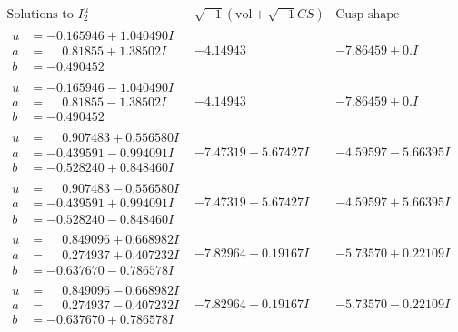 \documentclass[1p]{elsarticle_modified}
\theoremstyle{definition}
\newcommand{\I}{\sqrt{-1}}
\begin{document}
$$\begin{array}{c|c|c}  
\text{Solutions to }I^u_{2}& \I (\text{vol} + \sqrt{-1}CS) & \text{Cusp shape}\\
 \hline 
\begin{aligned}
u &= -0.165946 + 1.040490 I \\
a &= \phantom{-}0.81855 + 1.38502 I \\
b &= -0.490452\phantom{ +0.000000I}\end{aligned}
 & -4.14943\phantom{ +0.000000I} & -7.86459 + 0. I\phantom{ +0.000000I} \\ \hline\begin{aligned}
u &= -0.165946 - 1.040490 I \\
a &= \phantom{-}0.81855 - 1.38502 I \\
b &= -0.490452\phantom{ +0.000000I}\end{aligned}
 & -4.14943\phantom{ +0.000000I} & -7.86459 + 0. I\phantom{ +0.000000I} \\ \hline\begin{aligned}
u &= \phantom{-}0.907483 + 0.556580 I \\
a &= -0.439591 - 0.994091 I \\
b &= -0.528240 + 0.848460 I\end{aligned}
 & -7.47319 + 5.67427 I & -4.59597 - 5.66395 I \\ \hline\begin{aligned}
u &= \phantom{-}0.907483 - 0.556580 I \\
a &= -0.439591 + 0.994091 I \\
b &= -0.528240 - 0.848460 I\end{aligned}
 & -7.47319 - 5.67427 I & -4.59597 + 5.66395 I \\ \hline\begin{aligned}
u &= \phantom{-}0.849096 + 0.668982 I \\
a &= \phantom{-}0.274937 + 0.407232 I \\
b &= -0.637670 - 0.786578 I\end{aligned}
 & -7.82964 + 0.19167 I & -5.73570 + 0.22109 I \\ \hline\begin{aligned}
u &= \phantom{-}0.849096 - 0.668982 I \\
a &= \phantom{-}0.274937 - 0.407232 I \\
b &= -0.637670 + 0.786578 I\end{aligned}
 & -7.82964 - 0.19167 I & -5.73570 - 0.22109 I \\ \hline\begin{aligned}

\end{aligned}
\end{array}$$
\end{document}
